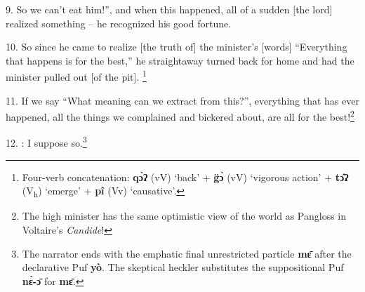 9. So we can't eat him!'', and when this happened, all of a sudden [the lord] realized
something -- he recognized his good fortune.

10. So since he came to realize [the truth of] the minister's [words] ``Everything
that happens is for the best,'' he straightaway turned back for home and had the minister pulled out [of the pit].
\footnote{Four-verb concatenation: \textbf{qɔ̀ʔ} (vV) `back' + \textbf{g̈ɔ̀} (vV) `vigorous action' + \textbf{tɔ̂ʔ} (V\textsubscript{h}) `emerge' + \textbf{pî} (Vv) `causative'.}

11. If we say ``What meaning can we extract from this?'', everything that has ever
happened, all the things we complained and bickered about, are all for the best!\footnote{The high minister has the same optimistic view of the world as Pangloss in Voltaire's \textit{Candide}!}

12.  : I suppose so.\footnote{The narrator ends with the emphatic final unrestricted particle \textbf{mɛ̄} after the declarative Puf \textbf{yò}. The skeptical heckler substitutes the suppositional Puf \textbf{nɛ̀-ɔ̄} for \textbf{mɛ̄}.}

